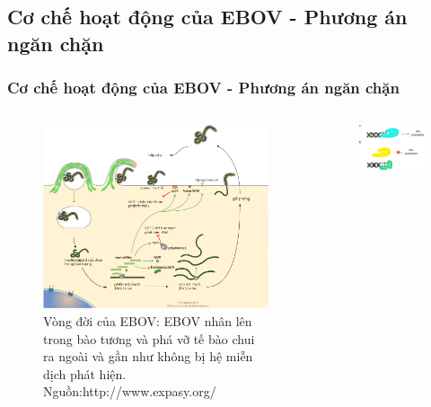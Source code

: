 \documentclass[10pt]{beamer}
\begin{document}
\subsection{Cơ chế hoạt động của EBOV - Phương án ngăn chặn}
	\begin{frame}
	\frametitle{Cơ chế hoạt động của EBOV - Phương án ngăn chặn}
	\begin{columns}[t]
	\begin{column}{0.5\textwidth}
		\begin{figure}[h]
		\centering
		\includegraphics[height=0.5\textheight,natwidth=610,natheight=642]{../Ebolavirus_cycle.png}
		\caption{Vòng đời của EBOV: EBOV nhân lên trong bào tương và phá vỡ tế bào chui ra ngoài và gần như không bị hệ miễn dịch phát hiện. Nguồn:http://www.expasy.org/}
		\label{fig:viruscycle}
		\end{figure}
	\end{column}
	\begin{column}{0.5\textwidth}
		\begin{figure}[h]
		\centering
		\includegraphics[height=0.25\textheight,natwidth=610,natheight=642]{../RIG-I}

\end{figure}
\end{column}
\end{columns}
\end{frame}
\end{document}
